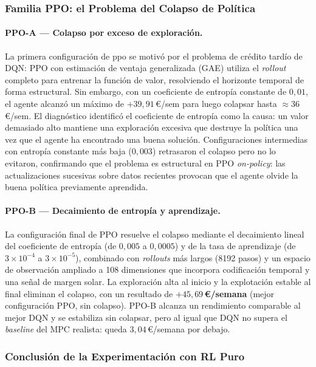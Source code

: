 \documentclass[12pt, a4paper, twoside]{report}
\begin{document}
\subsubsection{Familia PPO: el Problema del Colapso de Política}

\paragraph{PPO-A — Colapso por exceso de exploración.}
La primera configuración de \acrshort{ppo} se motivó por el problema de crédito
tardío de DQN: PPO con estimación de ventaja generalizada (GAE) utiliza el
\textit{rollout} completo para entrenar la función de valor, resolviendo el
horizonte temporal de forma estructural. Sin embargo, con un coeficiente de
entropía constante de $0{,}01$, el agente alcanzó un máximo de $+39{,}91$\,€/sem
para luego colapsar hasta $\approx$36\,€/sem. El diagnóstico identificó el
coeficiente de entropía como la causa: un valor demasiado alto mantiene una
exploración excesiva que destruye la política una vez que el agente ha
encontrado una buena solución. Configuraciones intermedias con entropía
constante más baja ($0{,}003$) retrasaron el colapso pero no lo evitaron,
confirmando que el problema es estructural en PPO \textit{on-policy}: las
actualizaciones sucesivas sobre datos recientes provocan que el agente olvide
la buena política previamente aprendida.

\paragraph{PPO-B — Decaimiento de entropía y aprendizaje.}
La configuración final de PPO resuelve el colapso mediante el decaimiento
lineal del coeficiente de entropía (de $0{,}005$ a $0{,}0005$) y de la tasa de
aprendizaje (de $3\times10^{-4}$ a $3\times10^{-5}$), combinado con
\textit{rollouts} más largos (8192 pasos) y un espacio de observación ampliado
a 108 dimensiones que incorpora codificación temporal y una señal de margen
solar. La exploración alta al inicio y la explotación estable al final
eliminan el colapso, con un resultado de \textbf{$+45{,}69$\,€/semana} (mejor
configuración PPO, sin colapso). PPO-B alcanza un rendimiento comparable al
mejor DQN y se estabiliza sin colapsar, pero al igual que DQN no supera el
\textit{baseline} del MPC realista: queda $3{,}04$\,€/semana por debajo.

\subsubsection{Conclusión de la Experimentación con RL Puro}
\end{document}
